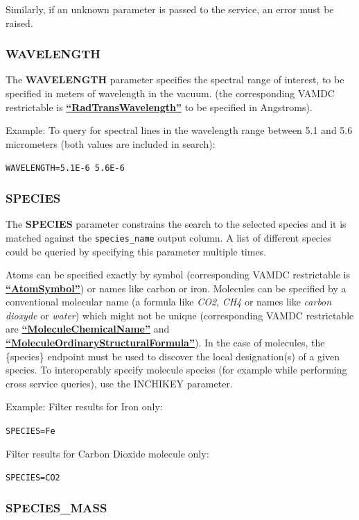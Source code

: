 \documentclass[11pt,a4paper]{ivoa}
\def\vamdcres#1{\href{https://dictionary.vamdc.eu/restrictables/\##1}{\textbf{``\color{vamdccolor}#1''}}}
\newcommand{\parexample}[1]{\noindent\quad\texttt{#1}}
\begin{document}
Similarly, if an unknown parameter is passed to the service, an error must be raised.

\subsubsection{WAVELENGTH}

The \textbf{WAVELENGTH} parameter specifies the spectral range of interest,
to be specified in meters of wavelength in the vacuum.
(the corresponding VAMDC restrictable is \vamdcres{RadTransWavelength}
to be specified in Angstroms).

Example: To query for spectral lines in the wavelength range between 5.1 and 5.6
micrometers (both values are included in search):

\parexample{WAVELENGTH=5.1E-6 5.6E-6}

\subsubsection{SPECIES}

The \textbf{SPECIES} parameter constrains the search to
the selected species and it is matched against the \texttt{species\_name} output column. A list of different species
could be queried by specifying this parameter multiple times.

Atoms can be specified exactly by symbol (corresponding VAMDC restrictable is \vamdcres{AtomSymbol}) or names
like carbon or iron.
Molecules can be specified by a conventional molecular name (a formula like \emph{CO2}, \emph{CH4} or names like \emph{carbon dioxyde}
or \emph{water}) which might not be unique (corresponding VAMDC restrictable are \vamdcres{MoleculeChemicalName} and
\vamdcres{MoleculeOrdinaryStructuralFormula}).
In the case of molecules, the \{species\} endpoint must be used
to discover the local designation(s) of a given species.
To interoperably specify molecule species (for example while performing cross service queries), use the INCHIKEY parameter.

Example: Filter results for Iron only:

\parexample{SPECIES=Fe}

Filter results for Carbon Dioxide molecule only:

\parexample{SPECIES=CO2}

\subsubsection{SPECIES\_MASS}
\end{document}
